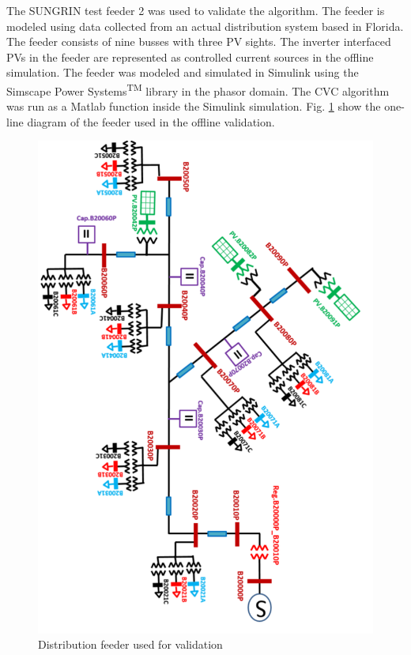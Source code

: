 The SUNGRIN test feeder 2 \cite{SG} was used to validate the algorithm. The feeder is modeled using data collected from an actual distribution system based in Florida. The feeder consists of nine busses with three PV sights. The inverter interfaced PVs in the feeder are represented as controlled current sources in the offline simulation. The feeder was modeled and simulated in Simulink using the Simscape Power Systems\textsuperscript{TM} library in the phasor domain. The CVC algorithm was run as a Matlab function inside the Simulink simulation. Fig. \ref{fig:feeder2} show the one-line diagram of the feeder used in the offline validation.
\begin{figure}[!htb]
\centering
\includegraphics[width=0.9\linewidth]{figs/feeder_r.png} 
\caption{Distribution feeder used for validation}
\label{fig:feeder2}
\end{figure}

